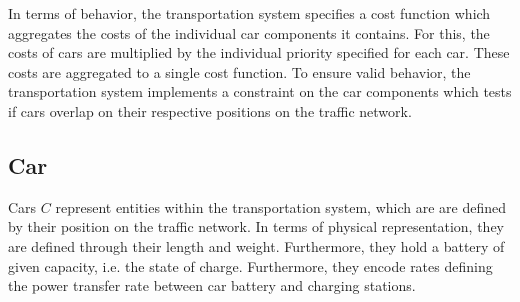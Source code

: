 




In terms of behavior, the transportation system specifies a cost function which aggregates the costs of the individual car components it contains. For this, the costs of cars are multiplied by the individual priority specified for each car. These costs are aggregated to a single cost function. To ensure valid behavior, the transportation system implements a constraint on the car components which tests if cars overlap on their respective positions on the traffic network.

\subsection{Car}

Cars $C$ represent entities within the transportation system, which are are defined by their position on the traffic network. In terms of physical representation, they are defined through their length and weight. Furthermore, they hold a battery of given capacity, i.e. the state of charge. Furthermore, they encode rates defining the power transfer rate between car battery and charging stations.

